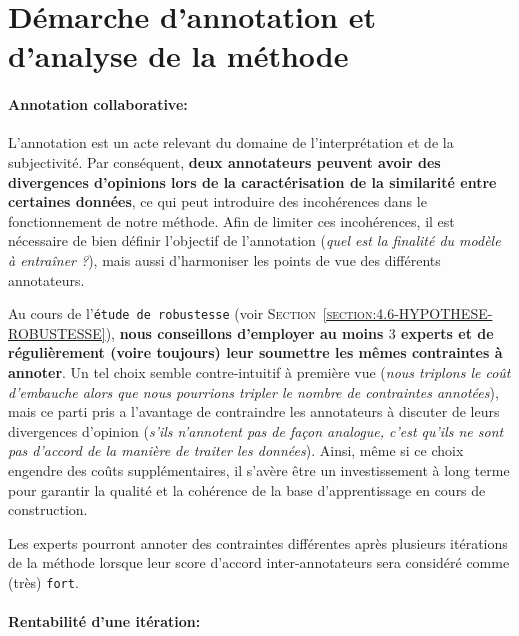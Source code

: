 	\section{Démarche d'annotation et d'analyse de la méthode}
	\label{section:5.3-GUIDE-UTILISER}
	
		\paragraph{\textcolor{colorSilverLakeBlue}{\faCheckSquare} Annotation collaborative:}
			
			L'annotation est un acte relevant du domaine de l'interprétation et de la subjectivité.
			Par conséquent, \textbf{deux annotateurs peuvent avoir des divergences d'opinions lors de la caractérisation de la similarité entre certaines données}, ce qui peut introduire des incohérences dans le fonctionnement de notre méthode.
			Afin de limiter ces incohérences, il est nécessaire de bien définir l'objectif de l'annotation (\textit{quel est la finalité du modèle à entraîner ?}), mais aussi d'harmoniser les points de vue des différents annotateurs.
			
			Au cours de l'\texttt{étude de robustesse} (voir \textsc{Section~\ref{section:4.6-HYPOTHESE-ROBUSTESSE}}), \textbf{nous conseillons d'employer au moins $3$ experts et de régulièrement (voire toujours) leur soumettre les mêmes contraintes à annoter}.
			Un tel choix semble contre-intuitif à première vue (\textit{nous triplons le coût d'embauche alors que nous pourrions tripler le nombre de contraintes annotées}), mais ce parti pris a l'avantage de contraindre les annotateurs à discuter de leurs divergences d'opinion (\textit{s'ils n'annotent pas de façon analogue, c'est qu'ils ne sont pas d'accord de la manière de traiter les données}).
			Ainsi, même si ce choix engendre des coûts supplémentaires, il s'avère être un investissement à long terme pour garantir la qualité et la cohérence de la base d'apprentissage en cours de construction.
			
			Les experts pourront annoter des contraintes différentes après plusieurs itérations de la méthode lorsque leur score d'accord inter-annotateurs sera considéré comme (très) \texttt{fort}.
		
		
		\paragraph{\textcolor{colorSilverLakeBlue}{\faCheckSquare} Rentabilité d'une itération:}
			
